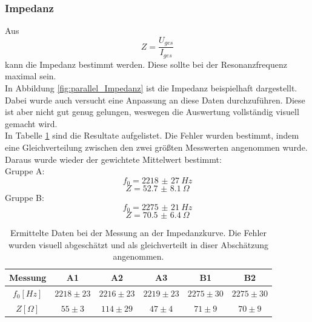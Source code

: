 \documentclass[12pt,a4paper]{article}
\begin{document}
\subsubsection{Impedanz}
Aus
\begin{equation}
Z = \dfrac{U_{ges}}{I_{ges}}
\end{equation}
kann die Impedanz bestimmt werden. Diese sollte bei der Resonanzfrequenz maximal sein.\\
In Abbildung \ref{fig:parallel_Impedanz} ist die Impedanz beispielhaft dargestellt. Dabei wurde auch versucht eine Anpassung an diese Daten durchzuführen. Diese ist aber nicht gut genug gelungen, weswegen die Auswertung vollständig visuell gemacht wird.\\
In Tabelle \ref{tab:Parallel_Impedanz} sind die Resultate aufgelistet. Die Fehler wurden bestimmt, indem eine Gleichverteilung zwischen den zwei größten Messwerten angenommen wurde.\\
Daraus wurde wieder der gewichtete Mittelwert bestimmt:\\
Gruppe A:
\begin{equation}
f_0 = \SI{2218(27)}{Hz}
\end{equation}
\begin{equation}
Z = \SI{52.7(81)}{\Omega}
\end{equation}
Gruppe B:
\begin{equation}
f_0 = \SI{2275(21)}{Hz}
\end{equation}
\begin{equation}
Z = \SI{70.5(64)}{\Omega}
\end{equation}

\begin{table}
\centering
\begin{tabular}{|c|c|c|c||c|c|}
\hline
Messung & A1 & A2 & A3 & B1 & B2\\
\hline
$f_0[Hz]$ & $2218\pm 23$ & $2216\pm 23$ & $2219\pm 23$ & $2275\pm 30$ & $2275\pm 30$\\
\hline
$Z[\Omega]$ & $55\pm 3$ & $114\pm 29$ & $47\pm 4$ & $71\pm 9$ & $70\pm 9$\\
\hline
\end{tabular}
\label{tab:Parallel_Impedanz}
\caption{Ermittelte Daten bei der Messung an der Impedanzkurve. Die Fehler wurden visuell abgeschätzt und als gleichverteilt in diser Abschätzung angenommen.}
\end{table}
\end{document}
